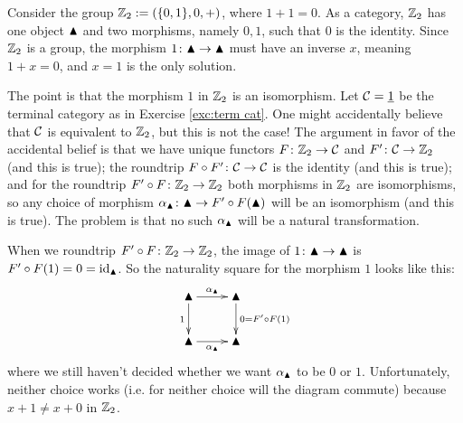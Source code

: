 \begin{example}\label{ex:Z1 not equiv Z2}

Consider the group ${\mathbb Z}_2:=(\{0,1\},0,+)$, where $1+1=0$. As a category, ${\mathbb Z}_2$ has one object $\blacktriangle$ and two morphisms, namely $0,1$, such that $0$ is the identity. Since ${\mathbb Z}_2$ is a group, the morphism $1\colon\blacktriangle\rightarrow\blacktriangle$ must have an inverse $x$, meaning $1+x=0$, and $x=1$ is the only solution.

The point is that the morphism $1$ in ${\mathbb Z}_2$ is an isomorphism. Let $\mathcal{C}=\underline{1}$ be the terminal category as in Exercise \ref{exc:term cat}. One might accidentally believe that $\mathcal{C}$ is equivalent to ${\mathbb Z}_2$, but this is not the case! The argument in favor of the accidental belief is that we have unique functors $F\colon{\mathbb Z}_2\rightarrow\mathcal{C}$ and $F'\colon\mathcal{C}\rightarrow{\mathbb Z}_2$ (and this is true); the roundtrip $F\circ F'\colon\mathcal{C}\rightarrow\mathcal{C}$ is the identity (and this is true); and for the roundtrip $F'\circ F\colon{\mathbb Z}_2\rightarrow{\mathbb Z}_2$ both morphisms in ${\mathbb Z}_2$ are isomorphisms, so any choice of morphism $\alpha_\blacktriangle\colon\blacktriangle\rightarrow F'\circ F(\blacktriangle)$ will be an isomorphism (and this is true). The problem is that no such $\alpha_\blacktriangle$ will be a natural transformation.

When we roundtrip $F'\circ F\colon{\mathbb Z}_2\rightarrow{\mathbb Z}_2$, the image of $1\colon\blacktriangle\rightarrow\blacktriangle$ is $F'\circ F(1)=0=\textnormal{id}_{\blacktriangle}$. So the naturality square for the morphism $1$ looks like this:
$$
\xymatrix{\monOb\ar[r]^{\alpha_\monOb}\ar[d]_{1}&\monOb\ar[d]^{0=F'\circ F(1)}\\\monOb\ar[r]_{\alpha_\monOb}&\monOb}
$$
where we still haven't decided whether we want $\alpha_\blacktriangle$ to be $0$ or $1$. Unfortunately, neither choice works (i.e. for neither choice will the diagram commute) because $x+1\neq x+0$ in ${\mathbb Z}_2$.

\end{example}

